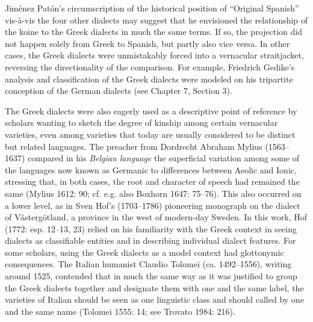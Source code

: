 \begin{styleStandard}
Jiménez Patón’s circumscription of the historical position of “Original Spanish” vis-à-vis the four other dialects may suggest that he envisioned the relationship of the koine to the Greek dialects in much the same terms. If so, the projection did not happen solely from Greek to Spanish, but partly also vice versa. In other cases, the Greek dialects were unmistakably forced into a vernacular straitjacket, reversing the directionality of the comparison. For example, Friedrich Gedike’s analysis and classification of the Greek dialects were modeled on his tripartite conception of the German dialects (see Chapter 7, Section 3).
\end{styleStandard}

\begin{styleStandard}
The Greek dialects were also eagerly used as a descriptive point of reference by scholars wanting to sketch the degree of kinship among certain vernacular varieties, even among varieties that today are usually considered to be distinct but related languages. The preacher from Dordrecht Abraham Mylius (1563–1637) compared in his \textit{Belgian language} the superficial variation among some of the languages now known as Germanic to differences between Aeolic and Ionic, stressing that, in both cases, the root and character of speech had remained the same (Mylius 1612: 90; cf. e.g. also Boxhorn 1647: 75–76). This also occurred on a lower level, as in Sven Hof’s (1703–1786) pioneering monograph on the dialect of Västergötland, a province in the west of modern-day Sweden. In this work, Hof (1772: esp. 12–13, 23) relied on his familiarity with the Greek context in seeing dialects as classifiable entities and in describing individual dialect features. For some scholars, using the Greek dialects as a model context had glottonymic consequences. The Italian humanist Claudio Tolomei (ca. 1492–1556), writing around 1525, contended that in much the same way as it was justified to group the Greek dialects together and designate them with one and the same label, the varieties of Italian should be seen as one linguistic class and should called by one and the same name (Tolomei 1555: 14; see Trovato 1984: 216).
\end{styleStandard}

